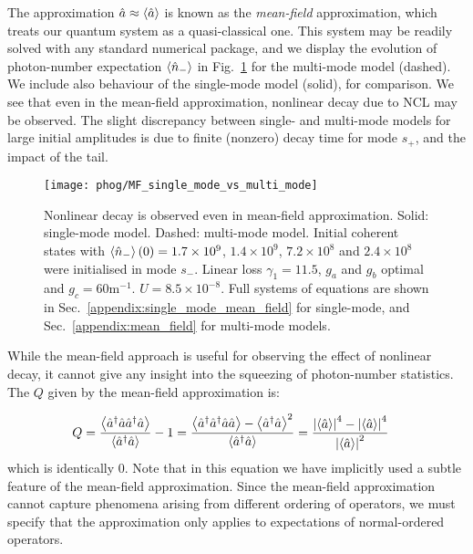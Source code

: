 The approximation $\hat{a} \approx \ev{\hat{a}}$ is known as the \emph{mean-field} approximation, which treats our quantum system as a quasi-classical one. This system may be readily solved with any standard numerical package, and we display the evolution of photon-number expectation $\ev{\hat{n}_-}$ in Fig.~\ref{fig:phog_MF_demonstration} for the multi-mode model (dashed). We include also behaviour of the single-mode model (solid), for comparison. We see that even in the mean-field approximation, nonlinear decay due to NCL may be observed. The slight discrepancy between single- and multi-mode models for large initial amplitudes is due to finite (nonzero) decay time for mode $s_+$, and the impact of the tail.


\begin{figure}[htp]
\captionsetup{width=\linewidth}
\centering
\texttt{[image: phog/MF\_single\_mode\_vs\_multi\_mode]}
\caption{\label{fig:phog_MF_demonstration} Nonlinear decay is observed even in mean-field approximation. Solid: single-mode model. Dashed: multi-mode model. Initial coherent states with $\ev{\hat{n}_-}\left(0\right) = 1.7\times 10^9$, $1.4\times10^9$, $7.2\times10^8$ and $2.4\times10^8$ were initialised in mode $s_-$. Linear loss $\gamma_1 = 11.5$, $g_a$ and $g_b$ optimal and $g_c = 60$m$^{-1}$. $U = 8.5\times10^{-8}$. Full systems of equations are shown in Sec.~\ref{appendix:single_mode_mean_field} for single-mode, and Sec.~\ref{appendix:mean_field} for multi-mode models.}
\end{figure}


While the mean-field approach is useful for observing the effect of nonlinear decay, it cannot give any insight into the squeezing of photon-number statistics. The $Q$ given by the mean-field approximation is:

\begin{align}
Q = \frac{\ev{\hat{a}^\dagger \hat{a} \hat{a}^\dagger \hat{a}}}{\ev{\hat{a}^\dagger \hat{a}}} - 1 &= \frac{\ev{\hat{a}^\dagger \hat{a}^\dagger \hat{a} \hat{a}} - \ev{\hat{a}^\dagger \hat{a}}^2}{\ev{\hat{a}^\dagger \hat{a}}} = \frac{\left|\ev{\hat{a}}\right|^4 - \left|\ev{\hat{a}}\right|^4}{\left|\ev{\hat{a}}\right|^2} \notag
\end{align}
which is identically $0$. Note that in this equation we have implicitly used a subtle feature of the mean-field approximation. Since the mean-field approximation cannot capture phenomena arising from different ordering of operators, we must specify that the approximation only applies to expectations of normal-ordered operators.

